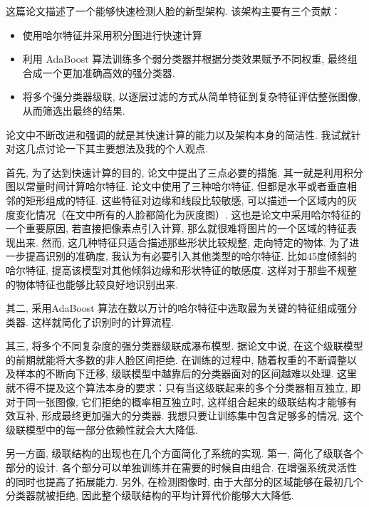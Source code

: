 \documentclass[utf8]{ctexart}
\begin{document}
这篇论文描述了一个能够快速检测人脸的新型架构. 该架构主要有三个贡献：
\begin{itemize}
  \item 使用哈尔特征并采用积分图进行快速计算
  \item 利用 AdaBoost 算法训练多个弱分类器并根据分类效果赋予不同权重, 最终组合成一个更加准确高效的强分类器. 
  \item 将多个强分类器级联, 以逐层过滤的方式从简单特征到复杂特征评估整张图像, 从而筛选出最终的结果. 
\end{itemize}

论文中不断改进和强调的就是其快速计算的能力以及架构本身的简洁性. 我试就针对这几点讨论一下其主要想法及我的个人观点.

首先, 为了达到快速计算的目的, 论文中提出了三点必要的措施. 其一就是利用积分图以常量时间计算哈尔特征. 论文中使用了三种哈尔特征, 但都是水平或者垂直相邻的矩形组成的特征. 这些特征对边缘和线段比较敏感, 可以描述一个区域内的灰度变化情况（在文中所有的人脸都简化为灰度图）. 这也是论文中采用哈尔特征的一个重要原因, 若直接把像素点引入计算, 那么就很难将图片的一个区域的特征表现出来. 然而, 这几种特征只适合描述那些形状比较规整, 走向特定的物体. 为了进一步提高识别的准确度, 我认为有必要引入其他类型的哈尔特征. 比如45度倾斜的哈尔特征, 提高该模型对其他倾斜边缘和形状特征的敏感度. 这样对于那些不规整的物体特征也能够比较良好地识别出来.

其二, 采用AdaBoost 算法在数以万计的哈尔特征中选取最为关键的特征组成强分类器. 这样就简化了识别时的计算流程.

其三, 将多个不同复杂度的强分类器级联成瀑布模型. 据论文中说, 在这个级联模型的前期就能将大多数的非人脸区间拒绝. 在训练的过程中, 随着权重的不断调整以及样本的不断向下迁移, 级联模型中越靠后的分类器面对的区间越难以处理. 这里就不得不提及这个算法本身的要求：只有当这级联起来的多个分类器相互独立, 即对于同一张图像, 它们拒绝的概率相互独立时, 这样组合起来的级联结构才能够有效互补, 形成最终更加强大的分类器. 我想只要让训练集中包含足够多的情况, 这个级联模型中的每一部分依赖性就会大大降低.

另一方面, 级联结构的出现也在几个方面简化了系统的实现. 第一, 简化了级联各个部分的设计. 各个部分可以单独训练并在需要的时候自由组合. 在增强系统灵活性的同时也提高了拓展能力. 另外, 在检测图像时, 由于大部分的区域能够在最初几个分类器就被拒绝, 因此整个级联结构的平均计算代价能够大大降低. 
\end{document}

